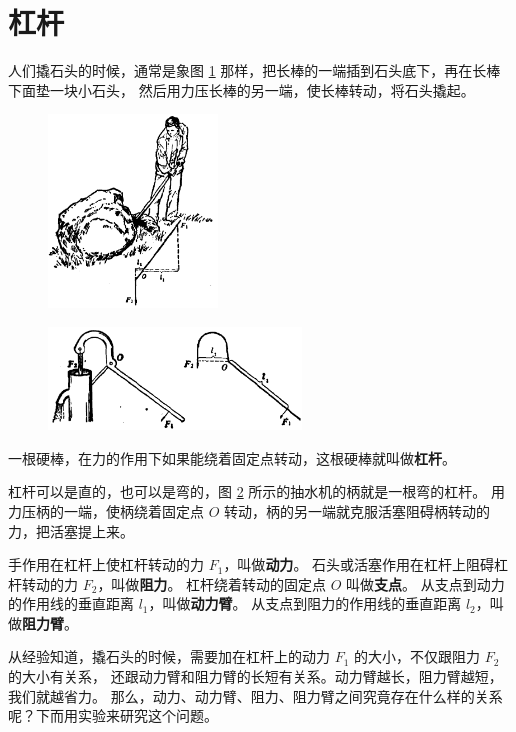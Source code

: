 \section{杠杆}\label{sec:7-1}

人们撬石头的时候，通常是象图 \ref{fig:7-1} 那样，把长棒的一端插到石头底下，再在长棒下面垫一块小石头，
然后用力压长棒的另一端，使长棒转动，将石头撬起。

\begin{figure}[htbp]
    \centering
    \includegraphics[width=0.4\textwidth]{../pic/czwl1-ch7-1}
    \caption{}\label{fig:7-1}
\end{figure}

\begin{figure}[htbp]
    \centering
    \includegraphics[width=0.6\textwidth]{../pic/czwl1-ch7-2}
    \caption{}\label{fig:7-2}
\end{figure}

一根硬棒，在力的作用下如果能绕着固定点转动，这根硬棒就叫做\textbf{杠杆}。

杠杆可以是直的，也可以是弯的，图 \ref{fig:7-2} 所示的抽水机的柄就是一根弯的杠杆。
用力压柄的一端，使柄绕着固定点 $O$ 转动，柄的另一端就克服活塞阻碍柄转动的力，把活塞提上来。

手作用在杠杆上使杠杆转动的力 $F_1$，叫做\textbf{动力}。
石头或活塞作用在杠杆上阻碍杠杆转动的力 $F_2$，叫做\textbf{阻力}。
杠杆绕着转动的固定点 $O$ 叫做\textbf{支点}。
从支点到动力的作用线\footnotemark 的垂直距离 $l_1$，叫做\textbf{动力臂}。
从支点到阻力的作用线的垂直距离 $l_2$，叫做\textbf{阻力臂}。


从经验知道，撬石头的时候，需要加在杠杆上的动力 $F_1$ 的大小，不仅跟阻力 $F_2$ 的大小有关系，
还跟动力臂和阻力臂的长短有关系。动力臂越长，阻力臂越短，我们就越省力。
那么，动力、动力臂、阻力、阻力臂之间究竟存在什么样的关系呢？下而用实验来研究这个问题。

